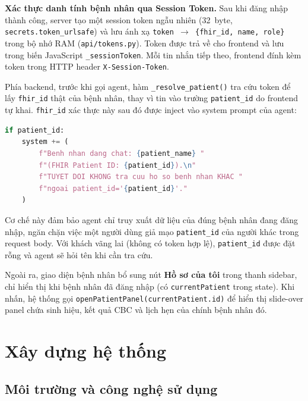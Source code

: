 \documentclass[oneside, a4paper]{book}
\theoremstyle{plain}
\theoremstyle{plain}
\theoremstyle{definition}
\theoremstyle{remark}
\begin{document}
\textbf{Xác thực danh tính bệnh nhân qua Session Token.}
Sau khi đăng nhập thành công, server tạo một session token ngẫu nhiên (32~byte, \texttt{secrets.token\_urlsafe}) và lưu ánh xạ \texttt{token~$\rightarrow$~\{fhir\_id, name, role\}} trong bộ nhớ RAM (\texttt{api/tokens.py}). Token được trả về cho frontend và lưu trong biến JavaScript \texttt{\_sessionToken}. Mỗi tin nhắn tiếp theo, frontend đính kèm token trong HTTP header \texttt{X-Session-Token}.

Phía backend, trước khi gọi agent, hàm \texttt{\_resolve\_patient()} tra cứu token để lấy \texttt{fhir\_id} thật của bệnh nhân, thay vì tin vào trường \texttt{patient\_id} do frontend tự khai. \texttt{fhir\_id} xác thực này sau đó được inject vào system prompt của agent:

\begin{lstlisting}[language=Python, caption={Inject danh tính bệnh nhân vào system prompt}]
if patient_id:
    system += (
        f"Benh nhan dang chat: {patient_name} "
        f"(FHIR Patient ID: {patient_id}).\n"
        f"TUYET DOI KHONG tra cuu ho so benh nhan KHAC "
        f"ngoai patient_id='{patient_id}'."
    )
\end{lstlisting}

Cơ chế này đảm bảo agent chỉ truy xuất dữ liệu của đúng bệnh nhân đang đăng nhập, ngăn chặn việc một người dùng giả mạo \texttt{patient\_id} của người khác trong request body. Với khách vãng lai (không có token hợp lệ), \texttt{patient\_id} được đặt rỗng và agent sẽ hỏi tên khi cần tra cứu.

Ngoài ra, giao diện bệnh nhân bổ sung nút \textbf{Hồ sơ của tôi} trong thanh sidebar, chỉ hiển thị khi bệnh nhân đã đăng nhập (có \texttt{currentPatient} trong state). Khi nhấn, hệ thống gọi \texttt{openPatientPanel(currentPatient.id)} để hiển thị slide-over panel chứa sinh hiệu, kết quả CBC và lịch hẹn của chính bệnh nhân đó.

\chapter{Xây dựng hệ thống}

\section{Môi trường và công nghệ sử dụng}
\end{document}
